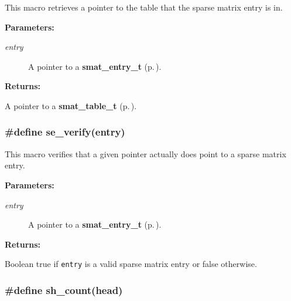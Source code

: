  This macro retrieves a pointer to the table that the sparse matrix entry is in.\begin{Desc}
\item[{\bf Parameters: }]\par
\begin{description}
\item[
{\em entry}]A pointer to a {\bf smat\_\-entry\_\-t} {\rm (p.\,\pageref{group__dbprim__smat_a2})}.

\end{description}
\end{Desc}
\begin{Desc}
\item[{\bf Returns: }]\par
A pointer to a {\bf smat\_\-table\_\-t} {\rm (p.\,\pageref{group__dbprim__smat_a0})}. \end{Desc}
\subsubsection{\setlength{\rightskip}{0pt plus 5cm}\#define se\_\-verify(entry)}\label{group__dbprim__smat_a39}




 This macro verifies that a given pointer actually does point to a sparse matrix entry.\begin{Desc}
\item[{\bf Parameters: }]\par
\begin{description}
\item[
{\em entry}]A pointer to a {\bf smat\_\-entry\_\-t} {\rm (p.\,\pageref{group__dbprim__smat_a2})}.

\end{description}
\end{Desc}
\begin{Desc}
\item[{\bf Returns: }]\par
Boolean true if {\tt entry} is a valid sparse matrix entry or false otherwise. \end{Desc}
\subsubsection{\setlength{\rightskip}{0pt plus 5cm}\#define sh\_\-count(head)}\label{group__dbprim__smat_a34}




